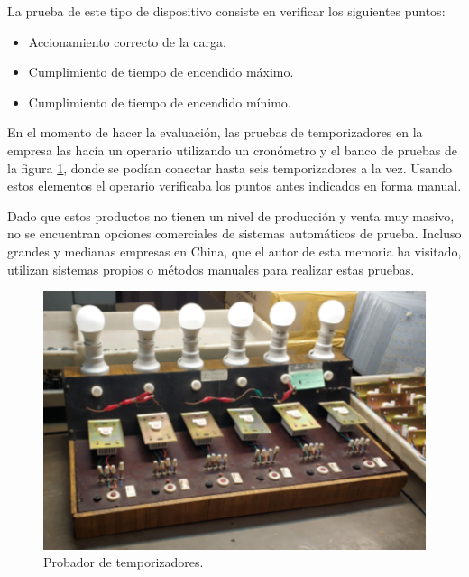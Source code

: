 

La prueba de este tipo de dispositivo consiste en verificar los siguientes puntos:

\begin{itemize}
	\item Accionamiento correcto de la carga.
	\item Cumplimiento de tiempo de encendido máximo.
	\item Cumplimiento de tiempo de encendido mínimo.
\end{itemize}

En el momento de hacer la evaluación, las pruebas de temporizadores en la empresa las hacía un operario utilizando un cronómetro y el banco de pruebas de la figura \ref{fig:Probador}, donde se podían conectar hasta seis temporizadores a la vez. Usando estos elementos el operario verificaba los puntos antes indicados en forma manual.



Dado que estos productos no tienen un nivel de producción y venta muy masivo, no se encuentran opciones comerciales de sistemas automáticos de prueba. Incluso grandes y medianas empresas en China, que el autor de esta memoria ha visitado, utilizan sistemas propios o métodos manuales para realizar estas pruebas.

\begin{figure}[H]
	\centering
	\includegraphics[scale=.8]{./Figures/Probador.png}
	\caption{Probador de temporizadores.}
	\label{fig:Probador}
\end{figure}

